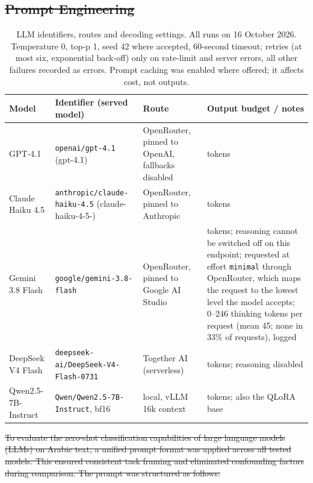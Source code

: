 \documentclass[preprint,12pt,authoryear]{elsarticle}
\providecommand{\DIFdel}[1]{{\protect\color{red}\sout{#1}}}                      %
\providecommand{\DIFaddbegin}{} %
\providecommand{\DIFaddend}{} %
\providecommand{\DIFdelbegin}{} %
\providecommand{\DIFdelend}{} %
\begin{document}
\DIFdelbegin \subsection{\DIFdel{Prompt Engineering}}
\addtocounter{subsection}{-1}%
\DIFdelend \DIFaddbegin \begin{table}[!ht]
\centering
\caption{LLM identifiers, routes and decoding settings. All runs on 16 October 2026. Temperature 0, top-p 1, seed 42 where accepted, 60-second timeout; retries (at most six, exponential back-off) only on rate-limit and server errors, all other failures recorded as errors. Prompt caching was enabled where offered; it affects cost, not outputs.}
\label{tab:llm_snapshots}
\small
\begin{tabularx}{\textwidth}{@{}>{\raggedright\arraybackslash}p{2.0cm} >{\raggedright\arraybackslash}p{4.1cm} >{\raggedright\arraybackslash}p{2.6cm} >{\raggedright\arraybackslash}X@{}}
\toprule
\textbf{Model} & \textbf{Identifier (served model)} & \textbf{Route} & \textbf{Output budget / notes} \\
\midrule
GPT-4.1 & \texttt{openai/gpt-4.1} (gpt-4.1) & OpenRouter, pinned to OpenAI, fallbacks disabled & 16 tokens \\
Claude Haiku 4.5 & \texttt{anthropic/\allowbreak claude-haiku-4.5} (claude-haiku-4-5-\allowbreak 20251001) & OpenRouter, pinned to Anthropic & 16 tokens \\
Gemini 3.8 Flash & \texttt{google/\allowbreak gemini-3.8-flash} & OpenRouter, pinned to Google AI Studio & 256 tokens; reasoning cannot be switched off on this endpoint; requested at effort \texttt{minimal} through OpenRouter, which maps the request to the lowest level the model accepts; 0--246 thinking tokens per request (mean 45; none in 33\% of requests), logged \\
DeepSeek V4 Flash & \texttt{deepseek-ai/\allowbreak DeepSeek-V4-\allowbreak Flash-0731} & Together AI (serverless) & 16 tokens; reasoning disabled \\
Qwen2.5-7B-Instruct & \texttt{Qwen/\allowbreak Qwen2.5-7B-Instruct}, bf16 & local, vLLM 16k context & 16 tokens; also the QLoRA base \\
\bottomrule
\end{tabularx}
\end{table}
\DIFaddend 

\DIFdelbegin \DIFdel{To evaluate the zero-shot classification capabilities of large language models (LLMs) on Arabic text, a unified prompt format was applied across all tested models. This ensured consistent task framing and eliminated confounding factors during comparison. The prompt was structured as follows:
}%
\end{document}

